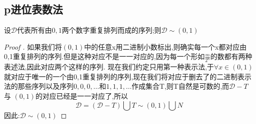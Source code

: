 \subsection{p进位表数法}
\begin{Theorem}[二进制的等价性]
    设\(\mathscr{D}\)代表所有由\(0,1\)两个数字重复排列而成的序列;则\(\mathscr{D} \sim (0,1)\)
\end{Theorem}
\begin{proof}[Proof ]
    如果我们将\((0,1)\)中的任意x用二进制小数标出,则确实每一个x都对应由0,1重复排列的序列.但是这种对应不是一一对应的,因为每一个形如\(\frac{m}{2^n}\)的数都有两种表述法,因此对应两个这样的序列. 现在我们约定只用第一种表示法,于\(\forall x \in (0,1)\)就对应于唯一的一个由0,1重复排列的序列,现在我们将对应于删去了的二进制表示法的那些序列以及序列\(0,0,0,\dots\)和\(1,1,1,\dots\)作成集合T,则T自然是可数的,而\(\mathscr{D}- T \)与
    \((0,1)\)的对应已经是一一对应了,所以
    \[\mathscr{D} = (\mathscr{D}-T)\bigcup T \sim (0,1)\bigcup N  \]
    因此:\(\mathscr{D} \sim (0,1)\)
\end{proof}
